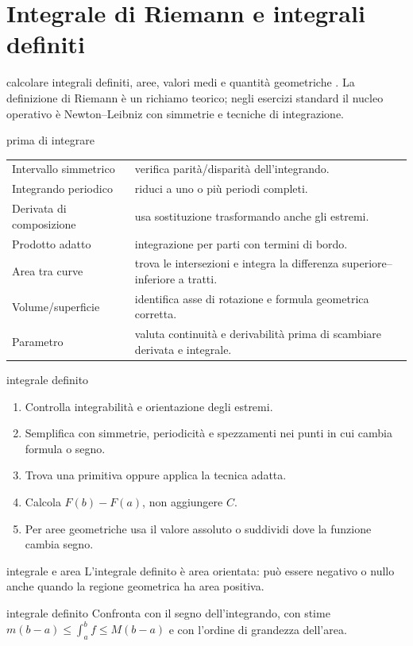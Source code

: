 \chapter{Integrale di Riemann e integrali definiti}
\label{chap:15}

\begin{obiettivocapitolo}{calcolare integrali definiti, aree, valori medi e quantità geometriche}
\prioritaalta. La definizione di Riemann è un richiamo teorico; negli esercizi standard il nucleo operativo è Newton--Leibniz con simmetrie e tecniche di integrazione.
\end{obiettivocapitolo}
\begin{sceltametodo}{prima di integrare}
\begin{tabularx}{\textwidth}{@{}p{}X@{}}
Intervallo simmetrico & verifica parità/disparità dell'integrando.\\
Integrando periodico & riduci a uno o più periodi completi.\\
Derivata di composizione & usa sostituzione trasformando anche gli estremi.\\
Prodotto adatto & integrazione per parti con termini di bordo.\\
Area tra curve & trova le intersezioni e integra la differenza superiore--inferiore a tratti.\\
Volume/superficie & identifica asse di rotazione e formula geometrica corretta.\\
Parametro & valuta continuità e derivabilità prima di scambiare derivata e integrale.
\end{tabularx}
\end{sceltametodo}
\begin{proceduraesame}{integrale definito}
\begin{enumerate}
\item Controlla integrabilità e orientazione degli estremi.
\item Semplifica con simmetrie, periodicità e spezzamenti nei punti in cui cambia formula o segno.
\item Trova una primitiva oppure applica la tecnica adatta.
\item Calcola $F(b)-F(a)$, non aggiungere $C$.
\item Per aree geometriche usa il valore assoluto o suddividi dove la funzione cambia segno.
\end{enumerate}
\end{proceduraesame}
\begin{errorefrequente}{integrale e area}
L'integrale definito è area orientata: può essere negativo o nullo anche quando la regione geometrica ha area positiva.
\end{errorefrequente}
\begin{controllofinale}{integrale definito}
Confronta con il segno dell'integrando, con stime $m(b-a)\le\int_a^b f\le M(b-a)$ e con l'ordine di grandezza dell'area.
\end{controllofinale}

